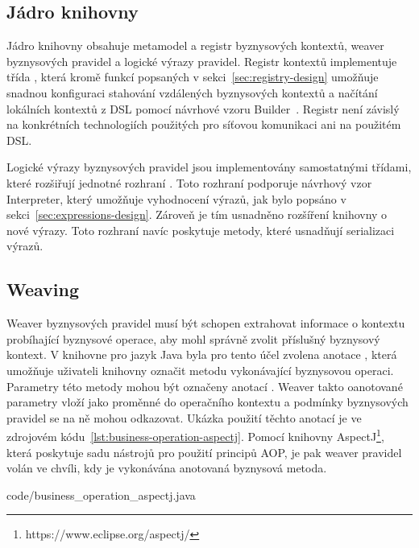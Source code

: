\subsection{Jádro knihovny}

Jádro knihovny obsahuje metamodel a registr byznysových kontextů, weaver byznysových pravidel
a logické výrazy pravidel. Registr kontextů implementuje třída ,
která kromě funkcí popsaných v sekci~\ref{sec:registry-design} umožňuje snadnou konfiguraci
stahování vzdálených byznysových kontextů a načítání lokálních kontextů z \gls{DSL} pomocí
návrhové vzoru Builder~\cite{fowler2002patterns}. Registr není závislý na konkrétních
technologiích použitých pro síťovou komunikaci ani na použitém \gls{DSL}.

Logické výrazy byznysových pravidel jsou implementovány samostatnými třídami, které rozšiřují
jednotné rozhraní . Toto rozhraní podporuje návrhový vzor Interpreter, který umožňuje
vyhodnocení výrazů, jak bylo popsáno v sekci~\ref{sec:expressions-design}. Zároveň je tím usnadněno
rozšíření knihovny o nové výrazy. Toto rozhraní navíc poskytuje metody, které usnadňují serializaci
výrazů.

\subsection{Weaving}

Weaver byznysových pravidel musí být schopen extrahovat informace o kontextu probíhající byznysové
operace, aby mohl správně zvolit příslušný byznysový kontext. V knihovne pro jazyk Java
byla pro tento účel zvolena anotace , která umožňuje uživateli
knihovny označit metodu vykonávající byznysovou operaci. Parametry této metody mohou být
označeny anotací . Weaver takto oanotované parametry vloží
jako proměnné do operačního kontextu a podmínky byznysových pravidel se na ně mohou odkazovat.
Ukázka použití těchto anotací je ve zdrojovém kódu~\ref{lst:business-operation-aspectj}.
Pomocí knihovny AspectJ\footnote{https://www.eclipse.org/aspectj/}, která poskytuje sadu nástrojů pro použití principů \gls{AOP},
je pak weaver pravidel volán ve chvíli, kdy je vykonávána anotovaná byznysová metoda.


{code/business_operation_aspectj.java}

